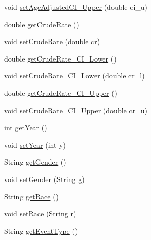 \begin{DoxyCompactItemize}
\item 
void \hyperlink{classbridges_1_1data__src__dependent_1_1_cancer_incidence_aeb386486bfbd96ba9ab689b7d95d4522}{set\+Age\+Adjusted\+C\+I\+\_\+\+Upper} (double ci\+\_\+u)
\item 
double \hyperlink{classbridges_1_1data__src__dependent_1_1_cancer_incidence_afc2ddb3099dffc46371ad7188278501d}{get\+Crude\+Rate} ()
\item 
void \hyperlink{classbridges_1_1data__src__dependent_1_1_cancer_incidence_a64a737fd7481262650efd596c508ffd6}{set\+Crude\+Rate} (double cr)
\item 
double \hyperlink{classbridges_1_1data__src__dependent_1_1_cancer_incidence_a8c410730b03abc78395e75b5024d495e}{get\+Crude\+Rate\+\_\+\+C\+I\+\_\+\+Lower} ()
\item 
void \hyperlink{classbridges_1_1data__src__dependent_1_1_cancer_incidence_a72e3960af58f32d26e32f49ada2f1555}{set\+Crude\+Rate\+\_\+\+C\+I\+\_\+\+Lower} (double cr\+\_\+l)
\item 
double \hyperlink{classbridges_1_1data__src__dependent_1_1_cancer_incidence_a4ca1ceed275ab6371f861d3a03975f15}{get\+Crude\+Rate\+\_\+\+C\+I\+\_\+\+Upper} ()
\item 
void \hyperlink{classbridges_1_1data__src__dependent_1_1_cancer_incidence_a99e25dd53093badf350b06b7e0c8b725}{set\+Crude\+Rate\+\_\+\+C\+I\+\_\+\+Upper} (double cr\+\_\+u)
\item 
int \hyperlink{classbridges_1_1data__src__dependent_1_1_cancer_incidence_aaff714019154afa796d54ed57ffc9492}{get\+Year} ()
\item 
void \hyperlink{classbridges_1_1data__src__dependent_1_1_cancer_incidence_aa5524736b76d67f1248d1a05d9f596a9}{set\+Year} (int y)
\item 
String \hyperlink{classbridges_1_1data__src__dependent_1_1_cancer_incidence_a2c3cbe65d89827c167f15314b8b088b3}{get\+Gender} ()
\item 
void \hyperlink{classbridges_1_1data__src__dependent_1_1_cancer_incidence_a217681578e13197e1d177932c73ea80f}{set\+Gender} (String g)
\item 
String \hyperlink{classbridges_1_1data__src__dependent_1_1_cancer_incidence_a18de1c14d36cd7656555c8465ea8a009}{get\+Race} ()
\item 
void \hyperlink{classbridges_1_1data__src__dependent_1_1_cancer_incidence_a8c26c4358561453f3d2ca3a463eed872}{set\+Race} (String r)
\item 
String \hyperlink{classbridges_1_1data__src__dependent_1_1_cancer_incidence_a844c6c3317bdb6b124f32b40804e1ff7}{get\+Event\+Type} ()

\end{DoxyCompactItemize}
